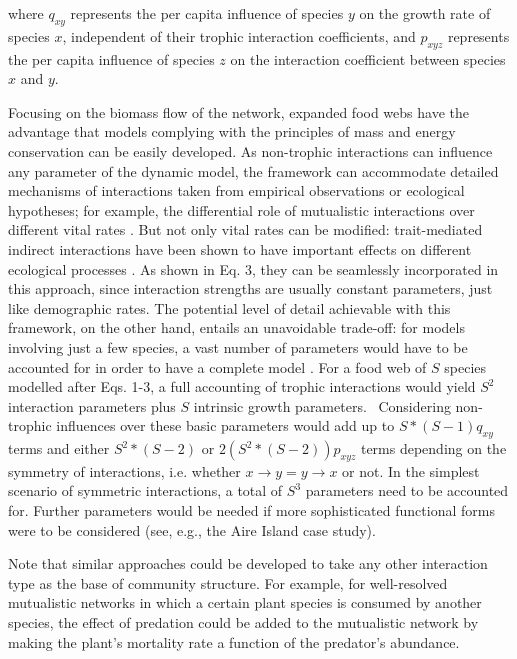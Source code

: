 where  $q_{\mathit{xy}}$ represents the per capita influence of species  $y$ on the growth rate of species  $x$, independent of their trophic interaction coefficients, and  $p_{\mathit{xyz}}$ represents the per capita influence of species  $z$ on the interaction coefficient between species  $x$ and  $y$.

Focusing on the biomass flow of the network, expanded food webs have the advantage that models complying with the principles of mass and energy conservation can be easily developed. As non-trophic interactions can influence any parameter of the dynamic model, the framework can accommodate detailed mechanisms of interactions taken from empirical observations or ecological hypotheses; for example, the differential role of mutualistic interactions over different vital rates \citep{Stachowicz2001}. But not only vital rates can be modified: trait-mediated indirect interactions have been shown to have important effects on different ecological processes \cite{Golubski2016}. As shown in Eq. 3, they can be seamlessly incorporated in this approach, since interaction strengths are usually constant parameters, just like demographic rates. The potential level of detail achievable with this framework, on the other hand, entails an unavoidable trade-off: for models involving just a few species, a vast number of parameters would have to be accounted for in order to have a complete model \cite{Golubski2011}. For a food web of  $S$ species modelled after Eqs. 1-3, a full accounting of trophic interactions would yield  $S^2$ interaction parameters plus  $S$ intrinsic growth parameters. \ Considering non-trophic influences over these basic parameters would add up to  $S{\ast}\left(S-1\right)q_{\mathit{xy}}$ terms and either  $S^2{\ast}\left(S-2\right)$ or  $2\left(S^2{\ast}\left(S-2\right)\right)p_{\mathit{xyz}}$  terms depending on the symmetry of interactions, i.e. whether  $x\rightarrow y=y\rightarrow x$  or not. In the simplest scenario of symmetric interactions, a total of  $S^3$  parameters need to be accounted for. Further parameters would be needed if more sophisticated functional forms were to be considered (see, e.g., the Aire Island case study).

Note that similar approaches could be developed to take any other interaction type as the base of community structure. For example, for well-resolved mutualistic networks in which a certain plant species is consumed by another species, the effect of predation could be added to the mutualistic network by making the plant's mortality rate a function of the predator's abundance.

